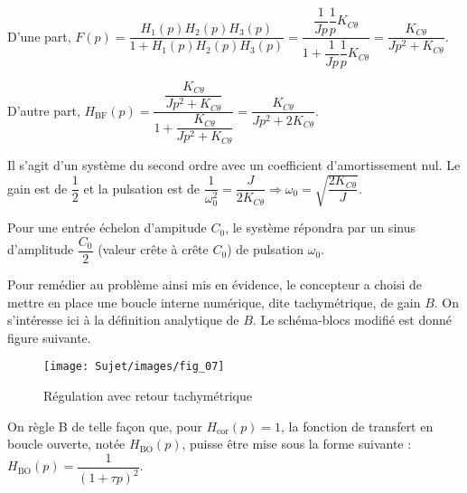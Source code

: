 
\ifprof
\begin{corrige}
D'une part, $F(p)=\dfrac{H_1(p)H_2(p)H_3(p)}{1+H_1(p)H_2(p)H_3(p)} =\dfrac{\dfrac{1}{Jp}\dfrac{1}{p}K_{C\theta}}{1+\dfrac{1}{Jp}\dfrac{1}{p}K_{C\theta}} =\dfrac{K_{C\theta}}{Jp^2+K_{C\theta}}$.

D'autre part, $H_{\text{BF}}(p)
=\dfrac{\dfrac{K_{C\theta}}{Jp^2+K_{C\theta}}}{1+\dfrac{K_{C\theta}}{Jp^2+K_{C\theta}}}=\dfrac{K_{C\theta}}{Jp^2+2K_{C\theta}}$.

\end{corrige}
\else
\fi

\ifprof
\begin{corrige}
Il s'agit d'un système du second ordre avec un coefficient d'amortissement nul. Le gain est de $\dfrac{1}{2}$ et la pulsation est de $\dfrac{1}{\omega_0^2}=\dfrac{J}{2K_{C\theta}} \Rightarrow \omega_0=\sqrt{\dfrac{2K_{C\theta}}{J}}$.

Pour une entrée échelon d'ampitude $C_0$, le système répondra par un sinus d'amplitude $\dfrac{C_0}{2}$ (valeur crête à crête $C_0$) de pulsation $\omega_0$.
\end{corrige}
\else
\fi


\ifprof
\else
Pour remédier au problème ainsi mis en évidence, le concepteur a choisi de mettre en place une boucle
interne numérique, dite tachymétrique, de gain $B$. On s’intéresse ici à la définition analytique de $B$.
Le schéma-blocs modifié est donné figure suivante.


\begin{figure}[!h]
\centering
\texttt{[image: Sujet/images/fig\_07]}

\caption{Régulation avec retour tachymétrique} 
\end{figure}


On règle B de telle façon que, pour $H_{\text{cor}}(p)=1$, la fonction de transfert en boucle ouverte, notée $H_{\text{BO}}(p)$, puisse être mise sous la forme suivante : 
$H_{\text{BO}}(p)=\dfrac{1}{\left(1+\tau p\right)^2}$.

\fi

